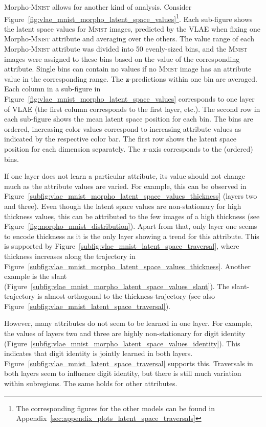 Morpho-\textsc{Mnist} allows for another kind of analysis.
Consider Figure~\ref{fig:vlae_mnist_morpho_latent_space_values}\footnote{The corresponding figures for the other models can be found in Appendix~\ref{sec:appendix_plots_latent_space_traversals}}.
Each sub-figure shows the latent space values for \textsc{Mnist} images, predicted by the \ac{VLAE} when fixing one Morpho-\textsc{Mnist} attribute and averaging over the others.
The value range of each Morpho-\textsc{Mnist} attribute was divided into 50 evenly-sized bins, and the \textsc{Mnist} images were assigned to these bins based on the value of the corresponding attribute.
Single bins can contain no values if no \textsc{Mnist} image has an attribute value in the corresponding range.
The $\bm{z}$-predictions within one bin are averaged.
Each column in a sub-figure in Figure~\ref{fig:vlae_mnist_morpho_latent_space_values} corresponds to one layer of \ac{VLAE} (the first column corresponds to the first layer, etc.).
The second row in each sub-figure shows the mean latent space position for each bin.
The bins are ordered, increasing color values correspond to increasing attribute values as indicated by the respective color bar.
The first row shows the latent space position for each dimension separately.
The $x$-axis corresponds to the (ordered) bins.

If one layer does not learn a particular attribute, its value should not change much as the attribute values are varied.
For example, this can be observed in Figure~\ref{subfig:vlae_mnist_morpho_latent_space_values_thickness} (layers two and three).
Even though the latent space values are non-stationary for high thickness values, this can be attributed to the few images of a high thickness (see Figure~\ref{fig:morpho_mnist_distribution}).
Apart from that, only layer one seems to encode thickness as it is the only layer showing a trend for this attribute.
This is supported by Figure~\ref{subfig:vlae_mnist_latent_space_traversal}, where thickness increases along the trajectory in Figure~\ref{subfig:vlae_mnist_morpho_latent_space_values_thickness}.
Another example is the slant (Figure~\ref{subfig:vlae_mnist_morpho_latent_space_values_slant}).
The slant-trajectory is almost orthogonal to the thickness-trajectory (see also Figure~\ref{subfig:vlae_mnist_latent_space_traversal}).

However, many attributes do not seem to be learned in one layer.
For example, the values of layers two and three are highly non-stationary for digit identity (Figure~\ref{subfig:vlae_mnist_morpho_latent_space_values_identity}).
This indicates that digit identity is jointly learned in both layers.
Figure~\ref{subfig:vlae_mnist_latent_space_traversal} supports this.
Traversals in both layers seem to influence digit identity, but there is still much variation within subregions.
The same holds for other attributes.

